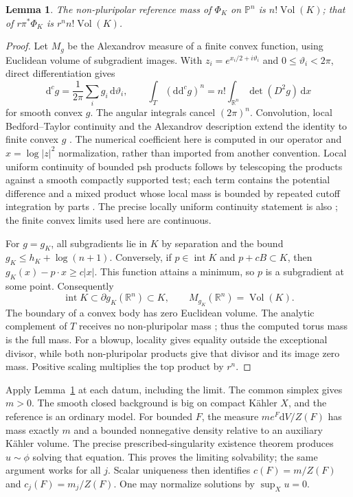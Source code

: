 \documentclass[11pt]{article}
\newtheorem{lemma}[theorem]{Lemma}
\newcommand{\ddc}{\mathrm d\mathrm d^c}
\newcommand{\Vol}{\operatorname{Vol}}
\newcommand{\CP}{\mathbb P}
\begin{document}
\begin{lemma}\label{lem:mass}
The non-pluripolar reference mass of $\Phi_K$ on $\CP^n$ is
$n!\Vol(K)$; that of $r\pi^*\Phi_K$ is $r^n n!\Vol(K)$.
\end{lemma}
\begin{proof}
Let $M_g$ be the Alexandrov measure of a finite convex function, using
Euclidean volume of subgradient images. With
$z_i=e^{x_i/2+i\vartheta_i}$ and $0\le\vartheta_i<2\pi$, direct
differentiation gives
\[
 \mathrm d^cg=\frac1{2\pi}\sum_i g_i\,\mathrm d\vartheta_i,
 \qquad
 \int_T(\ddc g)^n=n!\int_{\mathbb R^n}\det(D^2g)\,\mathrm dx
\]
for smooth convex $g$. The angular integrals cancel $(2\pi)^n$.
Convolution, local Bedford--Taylor continuity and the Alexandrov
description extend the identity to finite convex $g$
\cite[Sections 2.1--2.2]{BB}.
The numerical coefficient here is computed in our operator and
$x=\log|z|^2$ normalization, rather than imported from another convention.
Local uniform continuity of bounded psh products follows by telescoping
the products against a smooth compactly supported test; each term contains
the potential difference and a mixed product whose local mass is bounded
by repeated cutoff integration by parts \cite[Section 2]{BT}.
The precise locally uniform continuity statement is also
\cite[III.3.6]{Demailly}; the finite convex limits used here are continuous.

For $g=g_K$, all subgradients lie in $K$ by separation and the bound
$g_K\le h_K+\log(n+1)$. Conversely, if $p\in\operatorname{int}K$ and
$p+cB\subset K$, then $g_K(x)-p\cdot x\ge c|x|$.
This function attains a minimum, so $p$ is a subgradient at some point.
Consequently
\[
 \operatorname{int}K\subset\partial g_K(\mathbb R^n)\subset K,
 \qquad M_{g_K}(\mathbb R^n)=\Vol(K).
\]
The boundary of a convex body has zero Euclidean volume. The analytic
complement of $T$ receives no non-pluripolar mass
\cite[Section 1.2]{BEGZ}; thus the computed torus mass is the full mass.
For a blowup, locality gives equality outside the exceptional divisor,
while both non-pluripolar products give that divisor and its image zero
mass. Positive scaling multiplies the top product by $r^n$.
\end{proof}

Apply Lemma~\ref{lem:mass} at each datum, including the limit. The common
simplex gives $m>0$. The smooth closed background is big on compact
K\"ahler $X$, and the reference is an ordinary model. For bounded $F$,
the measure $m e^F\mathrm dV/Z(F)$ has mass exactly $m$ and a bounded
nonnegative density relative to an auxiliary K\"ahler volume.
The precise prescribed-singularity existence theorem
\cite[Theorem A(i)]{DDL} produces $u\sim\phi$ solving that equation.
This proves the limiting solvability; the same argument works for all $j$.
Scalar uniqueness then identifies $c(F)=m/Z(F)$ and $c_j(F)=m_j/Z(F)$.
One may normalize solutions by $\sup_Xu=0$.
\end{document}
